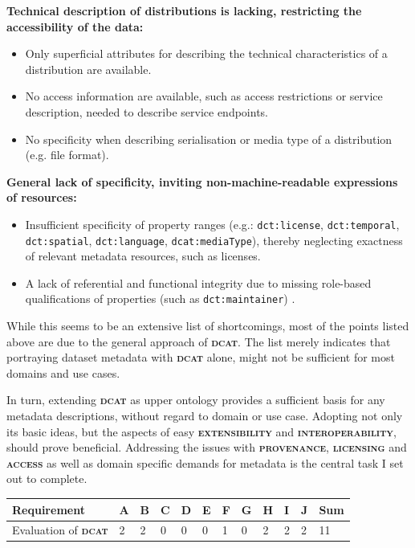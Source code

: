 \documentclass[a4paper,english,twoside,BCOR1.5cm,headsepline,DIV12,appendixprefix,final,12pt]{scrbook}
\newcommand{\provenance}{{\ttfamily\scshape\bfseries provenance}\xspace}
\newcommand{\licensing}{{\ttfamily\scshape\bfseries licensing}\xspace}
\newcommand{\access}{{\ttfamily\scshape\bfseries access}\xspace}
\newcommand{\extensibility}{{\ttfamily\scshape\bfseries extensibility}\xspace}
\newcommand{\interoperability}{{\ttfamily\scshape\bfseries interoperability}\xspace}
\newcommand{\dcat}{{\scshape\bfseries dcat}\xspace}
\newcommand{\prop}[1]{{{\texttt{#1}}}}
\begin{document}
\textbf{Technical description of distributions is lacking, restricting the accessibility of the data:}
\begin{itemize}
\item Only superficial attributes for describing the technical characteristics of a distribution are available.
\item No access information are available, such as access restrictions or service description, needed to describe service endpoints.
\item No specificity when describing serialisation or media type of a distribution (e.g. file format).
\end{itemize}

\textbf{General lack of specificity, inviting non-machine-readable expressions of resources:}
\begin{itemize}
\item Insufficient specificity of property ranges (e.g.: \prop{dct:license}, \prop{dct:temporal}, \prop{dct:spatial}, \prop{dct:language}, \prop{dcat:mediaType}), thereby neglecting exactness of relevant metadata resources, such as licenses.
\item A lack of referential and functional integrity due to missing role-based qualifications of properties (such as \prop{dct:maintainer}) \cite{jefferyCerifW3C2016}.
\end{itemize}

While this seems to be an extensive list of shortcomings, most of the points listed above are due to the general approach of \dcat. The list merely indicates that portraying dataset metadata with \dcat alone, might not be sufficient for most domains and use cases.

In turn, extending \dcat as upper ontology provides a sufficient basis for any metadata descriptions, without regard to domain or use case. Adopting not only its basic ideas, but the aspects of easy \extensibility and \interoperability, should prove beneficial. Addressing the issues with \provenance, \licensing and \access as well as domain specific demands for metadata is the central task I set out to complete.

\begin{table}[!htbp]
    \centering
    \begin{tabular}{|l|l|l|l|l|l|l|l|l|l|l|l|}
        \hline
        Requirement & A & B & C & D & E & F & G & H & I & J & Sum \\
        \hline
        Evaluation of \dcat & 2 & 2 & 0 & 0 & 0 & 1 & 0 & 2 & 2 & 2 & 11 \\
        \hline
    \end{tabular}
    \label{tab:evaldcat}
\end{table}
\end{document}

